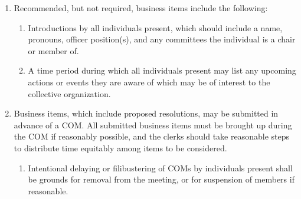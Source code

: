 \documentclass[11pt]{article}
\newcounter{h1}
\newcounter{h2}[h1]
\newcounter{h3}[h2]
\begin{document}
\begin{enumerate}
\begin{enumerate}
    \begin{enumerate}
      \item Any changes to the officer board's composition during the period since the last COM must be reported during officer reports, whether by the voting board of a general or special election or by the officers.
    \end{enumerate}
    \item Committee reports, during which any information relevant to the collective organization relating to committees' activities must be related by a chair of the committee, or by another individual if no such committee chair is present.
    \begin{enumerate}
      \item Any expiration, dissolution, or changes to name, purpose, chairing, at-large membership requirements, or lifespan of any committee during the period since the last COM must be reported during committee reports. If the committee has regularly scheduled meetings open to members of the collective organization, the times and locations of upcoming meetings should be shared.
    \end{enumerate}
    \item A period for other business to be conducted, during which any suitable rules of order may be used. This period must last for a minimum of 20 minutes, or until all business is completed, whichever occurs first.
  \end{enumerate}
  \item Recommended, but not required, business items include the following:
  \begin{enumerate}
    \item Introductions by all individuals present, which should include a name, pronouns, officer position(s), and any committees the individual is a chair or member of.
    \item A time period during which all individuals present may list any upcoming actions or events they are aware of which may be of interest to the collective organization.
  \end{enumerate}
  \item Business items, which include proposed resolutions, may be submitted in advance of a COM. All submitted business items must be brought up during the COM if reasonably possible, and the clerks should take reasonable steps to distribute time equitably among items to be considered.
  \begin{enumerate}
    \item Intentional delaying or filibustering of COMs by individuals present shall be grounds for removal from the meeting, or for suspension of members if reasonable.
  \end{enumerate}
\end{enumerate}
\end{document}

